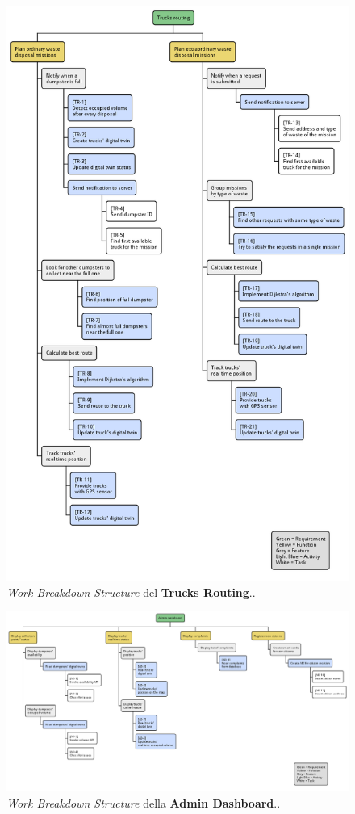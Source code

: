 \begin{figure}[H]
    \centering
    \includegraphics[width=\textwidth]{../img/wbs-trucks-routing.pm}
    \caption{\textit{Work Breakdown Structure} del \textbf{Trucks Routing}..}
    \label{fig:wbs-trucks-routing}
\end{figure}

\begin{figure}[H]
    \centering
    \includegraphics[width=\textwidth]{../img/wbs-admin-dashboard.pm}
    \caption{\textit{Work Breakdown Structure} della \textbf{Admin Dashboard}..}
    \label{fig:wbs-admin-dashboard}
\end{figure}


